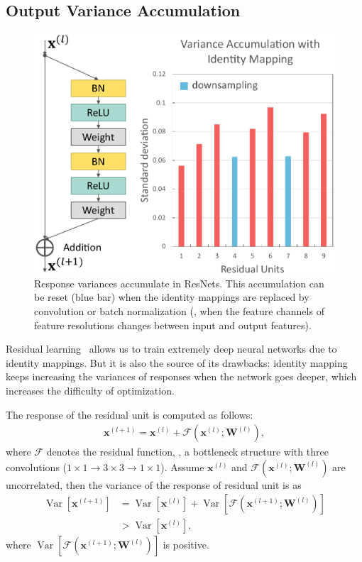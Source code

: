 \documentclass[10pt,twocolumn,letterpaper]{article}
\newcommand{\cF}{\mathcal{F}}
\newcommand{\W}{\mathbf{W}}
\newcommand{\bx}{\mathbf{x}}
\newcommand{\Var}{\operatorname{Var}}
\begin{document}
\subsection{Output Variance Accumulation}\label{sec:control_va}
%
%
\begin{figure}[t]
	\begin{center}
		\includegraphics[width=0.8\linewidth]{figures/variance_accumulation2.pdf}
	\end{center}
	\caption{ Response variances accumulate in ResNets. This accumulation can be reset (blue bar) when the identity mappings are replaced by convolution or batch normalization (\ie, when the feature channels of feature resolutions changes between input and output features).}
	\label{fig:variance_accumulation}
	\vspace{-1.5em}
\end{figure}
Residual learning~\cite{he2016deep,he2016identity} allows us to train extremely deep neural networks due to  identity mappings. 
But it is also the source of its drawbacks: identity mapping keeps increasing the variances of responses when the network goes deeper, which increases the difficulty of optimization. 

The response of the residual unit is computed as follows:
{\small
\begin{align}
\bx^{(l+1)} = \bx^{(l)} + \cF\left(\bx^{(l)}; \W^{(l)}\right),
\end{align}
}
\!\!where $\cF$ denotes the residual function, \eg, a bottleneck structure with three convolutions ($1\times1\rightarrow 3\times 3 \rightarrow 1\times 1$). 
Assume $\bx^{(l)}$ and $\cF\left(\bx^{(l)}; \W^{(l)}\right)$ are uncorrelated, then the variance of the response of residual unit is as
{\small
\begin{align}
\Var\left[\bx^{(l+1)}\right] &= \Var\left[\bx^{(l)}\right] + \Var\left[\cF\left(\bx^{(l+1)}; \W^{(l)}\right)\right] \nonumber \\
&> \Var\left[\bx^{(l)}\right],
\end{align}
}
\!\!where $\Var\left[\cF\left(\bx^{(l+1)}; \W^{(l)}\right)\right]$ is positive. 
\end{document}
